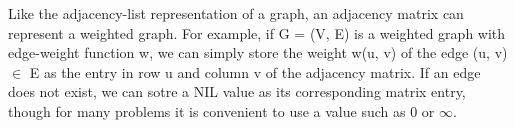 \documentclass[preview]{standalone}
\begin{document}
\begin{center}
Like the adjacency-list representation of a graph, an adjacency matrix can represent a weighted graph. For example, if G = (V, E) is a weighted graph with edge-weight function w, we can simply store the weight w(u, v) of the edge (u, v) $\in$ E as the entry in row u and column v of the adjacency matrix. If an edge does not exist, we can sotre a NIL value as its corresponding matrix entry, though for many problems it is convenient to use a value such as 0 or $\infty$.
\end{center}
\end{document}
